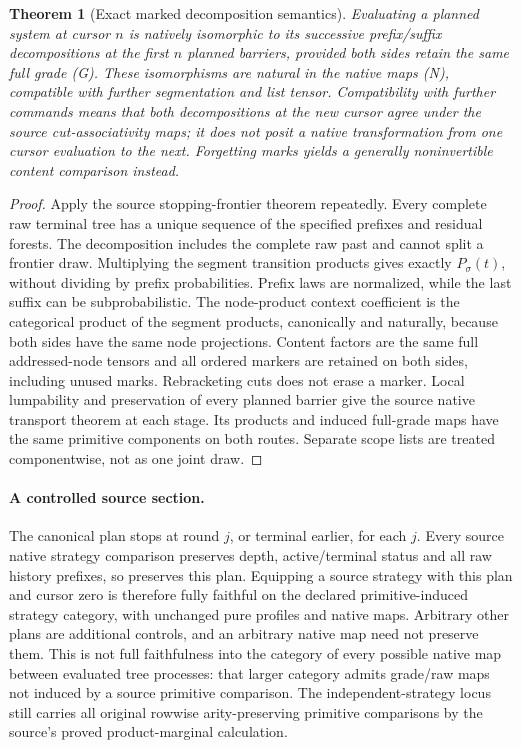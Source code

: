 \documentclass{article}
\newtheorem{theorem}{Theorem}\newtheorem{proposition}[theorem]{Proposition}
\begin{document}
\begin{theorem}[Exact marked decomposition semantics]
Evaluating a planned system at cursor $n$ is natively isomorphic to its
successive prefix/suffix decompositions at the first $n$ planned barriers,
provided both sides retain the same full grade (G). These isomorphisms are natural
in the native maps (N), compatible with further segmentation and list tensor.
Compatibility with further commands means that both decompositions at the
new cursor agree under the source cut-associativity maps; it does not posit
a native transformation from one cursor evaluation to the next.
Forgetting marks yields a generally noninvertible content comparison instead.
\end{theorem}
\begin{proof}
Apply the source stopping-frontier theorem repeatedly. Every complete raw
terminal tree has a unique sequence of the specified prefixes and residual
forests. The decomposition includes the complete raw past and cannot split a
frontier draw. Multiplying the segment transition products gives exactly
$P_\sigma(t)$, without dividing by prefix probabilities. Prefix laws are
normalized, while the last suffix can be subprobabilistic. The node-product
context coefficient is the categorical product of the segment products,
canonically and naturally, because both sides have the same node projections.
Content factors are the same full addressed-node tensors and all ordered
markers are retained on both sides, including unused marks. Rebracketing cuts
does not erase a marker. Local lumpability and preservation of every planned
barrier give the source native transport theorem at each stage. Its products
and induced full-grade maps have the same primitive components on both
routes. Separate scope lists are treated componentwise, not as one joint draw.
\end{proof}

\paragraph{A controlled source section.}
The canonical plan stops at round $j$, or terminal earlier, for each $j$.
Every source native strategy comparison preserves depth, active/terminal
status and all raw history prefixes, so preserves this plan. Equipping a
source strategy with this plan and cursor zero is therefore fully faithful
on the declared primitive-induced strategy category, with unchanged pure
profiles and native maps. Arbitrary other plans are additional controls, and
an arbitrary native map need not preserve them. This is not full faithfulness
into the category of every possible native map between evaluated tree
processes: that larger category admits grade/raw maps not induced by a source
primitive comparison. The independent-strategy locus still carries all
original rowwise arity-preserving primitive comparisons by the source's
proved product-marginal calculation.
\end{document}
